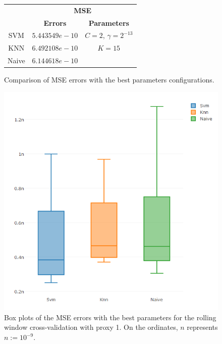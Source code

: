 \begin{figure}[!h]
\centering
\begin{tabular}{|c|c|c|}
   \hline
   & \multicolumn{2}{|c|}{\textbf{MSE}} \\ \cline{2-3}
   & \textbf{Errors} & \textbf{Parameters}          \\ \hline
   SVM  & $5.443549e-10$        & $C = 2$, $\gamma = 2^{-13}$          \\ 
   KNN & $6.492108e-10$ & $K = 15$ \\ 
   Naive & $6.144618e-10$ &      \\ 
   \hline
   \end{tabular}
\caption{Comparison of MSE errors with the best parameters configurations.}
\label{fig:table6mMSEp1}
\centering
\includegraphics[width=\linewidth]{img/6mproxy1MSE.png}
\caption{Box plots of the MSE errors with the best parameters for the rolling window cross-validation with proxy 1. On the ordinates, $n$ represents $n := 10^{-9}$.}
\end{figure}


